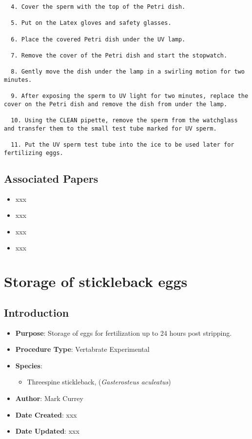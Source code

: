 \documentclass[
  letterpaper,
  DIV=11,
  numbers=noendperiod]{scrreprt}
\providecommand{\tightlist}{%
  \setlength{\itemsep}{0pt}\setlength{\parskip}{0pt}}\usepackage{longtable,booktabs,array}
\begin{document}
\begin{verbatim}
  4. Cover the sperm with the top of the Petri dish. 
  
  5. Put on the Latex gloves and safety glasses. 
  
  6. Place the covered Petri dish under the UV lamp. 
  
  7. Remove the cover of the Petri dish and start the stopwatch. 
  
  8. Gently move the dish under the lamp in a swirling motion for two minutes. 
  
  9. After exposing the sperm to UV light for two minutes, replace the cover on the Petri dish and remove the dish from under the lamp. 
  
  10. Using the CLEAN pipette, remove the sperm from the watchglass and transfer them to the small test tube marked for UV sperm. 
  
  11. Put the UV sperm test tube into the ice to be used later for fertilizing eggs.
\end{verbatim}

\hypertarget{associated-papers-58}{%
\section{Associated Papers}\label{associated-papers-58}}

\begin{itemize}
\tightlist
\item
  xxx
\item
  xxx
\item
  xxx
\item
  xxx
\end{itemize}

\hypertarget{sec-vert_exp-egg_storage_SB}{%
\chapter{Storage of stickleback
eggs}\label{sec-vert_exp-egg_storage_SB}}

\hypertarget{introduction-90}{%
\section{Introduction}\label{introduction-90}}

\begin{itemize}
\tightlist
\item
  \textbf{Purpose}: Storage of eggs for fertilization up to 24 hours
  post stripping.
\item
  \textbf{Procedure Type}: Vertabrate Experimental
\item
  \textbf{Species}:

  \begin{itemize}
  \tightlist
  \item
    Threespine stickleback, (\emph{Gasterosteus aculeatus})
  \end{itemize}
\item
  \textbf{Author}: Mark Currey
\item
  \textbf{Date Created}: xxx
\item
  \textbf{Date Updated}: xxx
\end{itemize}
\end{document}
